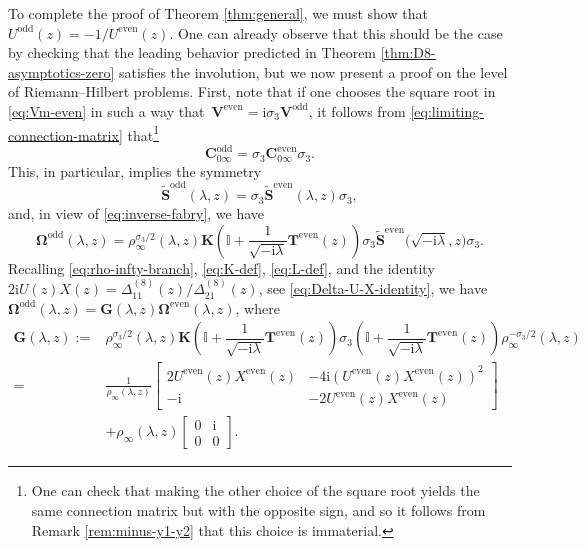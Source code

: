 \documentclass[pdftex]{sigma}
\numberwithin{equation}{section}
\newcommand{\ii}{\mathrm{i}}
\begin{document}
To complete the proof of Theorem \ref{thm:general}, we must show that $U^{\mathrm{odd}}(z) = -1/U^{\mathrm{even}}(z)$. One can already observe that this should be the case by checking that the leading behavior predicted in Theorem \ref{thm:D8-asymptotics-zero} satisfies the involution, but we now present a proof on the level of Riemann--Hilbert problems. First, note that if one chooses the square root in \eqref{eq:Vm-even} in such a way that~$\mathbf{V}^\mathrm{even} = \ii \sigma_3 \mathbf{V}^\mathrm{odd}$, it follows from \eqref{eq:limiting-connection-matrix} that\footnote{One can check that making the other choice of the square root yields the same connection matrix but with the opposite sign, and so it follows from Remark \ref{rem:minus-y1-y2} that this choice is immaterial.}
\[
 \mathbf{C}_{0\infty}^{\mathrm{odd}} = \sigma_3 \mathbf{C}^{\mathrm{even}}_{0 \infty} \sigma_3.
\]
This, in particular, implies the symmetry
\[
\widetilde{\mathbf{S}}^{\mathrm{odd}}(\lambda, z) = \sigma_3 \widetilde{\mathbf{S}}^{\mathrm{even}}(\lambda, z) \sigma_3,
\]
and, in view of \eqref{eq:inverse-fabry}, we have
\begin{equation}
 \mathbf{\Omega}^{\mathrm{odd}}(\lambda, z) = \rho_\infty^{\sigma_3/2}(\lambda, z) \mathbf{K}\left( \mathbb{I} + \dfrac{1}{\sqrt{-\ii \lambda}} \mathbf{T}^{\mathrm{even}}(z) \right) \sigma_3 \widetilde{\mathbf{S}}^{\mathrm{even}}\big(\sqrt{-\ii \lambda}, z\big) \sigma_3.
 \label{eq:Omega-even-odd}
\end{equation}
Recalling \eqref{eq:rho-infty-branch}, \eqref{eq:K-def}, \eqref{eq:L-def}, and the identity $2\ii U(z)X(z) = \Delta^{(8)}_{11}(z)/\Delta^{(8)}_{21}(z)$, see \eqref{eq:Delta-U-X-identity}, we have~$\mathbf{\Omega}^{\mathrm{odd}}(\lambda, z) = \mathbf{G}(\lambda, z) \mathbf{\Omega}^{\mathrm{even}}(\lambda, z)$, where
\begin{align}
\mathbf{G}(\lambda, z):={}& \rho_\infty^{\sigma_3/2}(\lambda, z) \mathbf{K}\left( \mathbb{I} + \dfrac{1}{\sqrt{-\ii \lambda}} \mathbf{T}^{\mathrm{even}}(z) \right) \sigma_3 \left( \mathbb{I} + \dfrac{1}{\sqrt{-\ii \lambda}} \mathbf{T}^{\mathrm{even}}(z) \right) \rho_\infty^{-\sigma_3/2}(\lambda, z) \nonumber\\
={}& \frac{1}{\rho_\infty(\lambda, z)}\begin{bmatrix} 2U^{\mathrm{even}}(z)X^{\mathrm{even}}(z) & -4\ii (U^{\mathrm{even}}(z) X^{\mathrm{even}}(z))^2 \\ -\ii & -2U^{\mathrm{even}}(z)X^{\mathrm{even}}(z) \end{bmatrix}\nonumber\\
& + \rho_\infty(\lambda, z) \begin{bmatrix}
 0 & \ii \\ 0 & 0
\end{bmatrix}.\label{eq:G-def}
\end{align}
\end{document}
